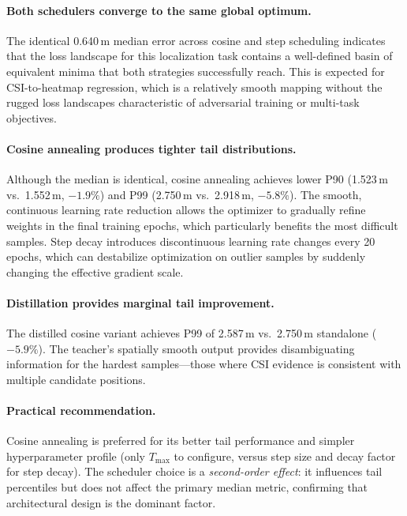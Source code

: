 \documentclass[11pt,a4paper]{article}
\begin{document}
\paragraph{Both schedulers converge to the same global optimum.}
The identical 0.640\,m median error across cosine and step scheduling indicates that the loss landscape for this localization task contains a well-defined basin of equivalent minima that both strategies successfully reach.
This is expected for CSI-to-heatmap regression, which is a relatively smooth mapping without the rugged loss landscapes characteristic of adversarial training or multi-task objectives.

\paragraph{Cosine annealing produces tighter tail distributions.}
Although the median is identical, cosine annealing achieves lower P90 (1.523\,m vs.\ 1.552\,m, $-1.9\%$) and P99 (2.750\,m vs.\ 2.918\,m, $-5.8\%$).
The smooth, continuous learning rate reduction allows the optimizer to gradually refine weights in the final training epochs, which particularly benefits the most difficult samples.
Step decay introduces discontinuous learning rate changes every 20 epochs, which can destabilize optimization on outlier samples by suddenly changing the effective gradient scale.

\paragraph{Distillation provides marginal tail improvement.}
The distilled cosine variant achieves P99 of 2.587\,m vs.\ 2.750\,m standalone ($-5.9\%$).
The teacher's spatially smooth output provides disambiguating information for the hardest samples---those where CSI evidence is consistent with multiple candidate positions.

\paragraph{Practical recommendation.}
Cosine annealing is preferred for its better tail performance and simpler hyperparameter profile (only $T_{\max}$ to configure, versus step size and decay factor for step decay).
The scheduler choice is a \emph{second-order effect}: it influences tail percentiles but does not affect the primary median metric, confirming that architectural design is the dominant factor.


\end{document}
